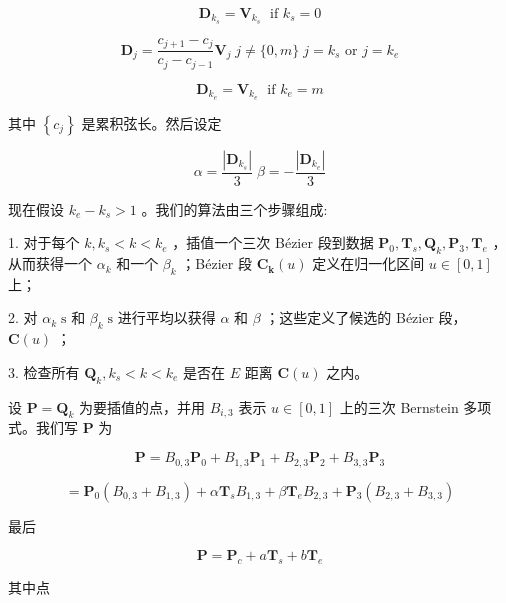 \documentclass[../main.tex]{subfiles}
\begin{document}
\[
{\mathbf{D}}_{{k}_{s}} = {\mathbf{V}}_{{k}_{s}}\;\text{ if }{k}_{s} = 0
\]

\[
{\mathbf{D}}_{j} = \frac{{c}_{j + 1} - {c}_{j}}{{c}_{j} - {c}_{j - 1}}{\mathbf{V}}_{j}\;j \neq  \{ 0,m\} \;j = {k}_{s}\text{ or }j = {k}_{e}
\]

\[
{\mathbf{D}}_{{k}_{e}} = {\mathbf{V}}_{{k}_{e}}\;\text{ if }{k}_{e} = m \tag{9.93}
\]

其中 \(\left\{  {c}_{j}\right\}\) 是累积弦长。然后设定

\[
\alpha  = \frac{\left| {\mathbf{D}}_{{k}_{s}}\right| }{3}\;\beta  =  - \frac{\left| {\mathbf{D}}_{{k}_{e}}\right| }{3} \tag{9.94}
\]

现在假设 \({k}_{e} - {k}_{s} > 1\) 。我们的算法由三个步骤组成:

1. 对于每个 \(k,{k}_{s} < k < {k}_{e}\) ，插值一个三次 Bézier 段到数据 \({\mathbf{P}}_{0},{\mathbf{T}}_{s},{\mathbf{Q}}_{k},{\mathbf{P}}_{3},{\mathbf{T}}_{e}\) ，从而获得一个 \({\alpha }_{k}\) 和一个 \({\beta }_{k}\) ；Bézier 段 \({\mathbf{C}}_{\mathbf{k}}\left( u\right)\) 定义在归一化区间 \(u \in  \left\lbrack  {0,1}\right\rbrack\) 上；





2. 对 \({\alpha }_{k}\mathrm{\;s}\) 和 \({\beta }_{k}\mathrm{\;s}\) 进行平均以获得 \(\alpha\) 和 \(\beta\) ；这些定义了候选的 Bézier 段， \(\mathbf{C}\left( u\right)\) ；

3. 检查所有 \({\mathbf{Q}}_{k},{k}_{s} < k < {k}_{e}\) 是否在 \(E\) 距离 \(\mathbf{C}\left( u\right)\) 之内。



设 \(\mathbf{P} = {\mathbf{Q}}_{k}\) 为要插值的点，并用 \({B}_{i,3}\) 表示 \(u \in  \left\lbrack  {0,1}\right\rbrack\) 上的三次 Bernstein 多项式。我们写 \(\mathbf{P}\) 为

\[
\mathbf{P} = {B}_{0,3}{\mathbf{P}}_{0} + {B}_{1,3}{\mathbf{P}}_{1} + {B}_{2,3}{\mathbf{P}}_{2} + {B}_{3,3}{\mathbf{P}}_{3}
\]



\[
= {\mathbf{P}}_{0}\left( {{B}_{0,3} + {B}_{1,3}}\right)  + \alpha {\mathbf{T}}_{s}{B}_{1,3} + \beta {\mathbf{T}}_{e}{B}_{2,3} + {\mathbf{P}}_{3}\left( {{B}_{2,3} + {B}_{3,3}}\right)  \tag{9.95}
\]



最后

\[
\mathbf{P} = {\mathbf{P}}_{c} + a{\mathbf{T}}_{s} + b{\mathbf{T}}_{e} \tag{9.96}
\]

其中点
\end{document}

